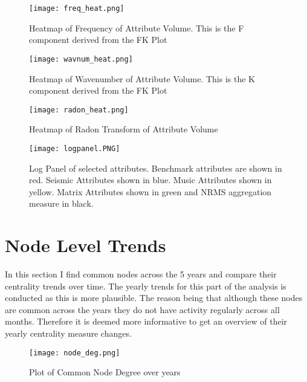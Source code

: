 \begin{figure}[!htp]
    \centering
    \texttt{[image: freq\_heat.png]}
    \caption{Heatmap of Frequency of Attribute Volume. This is the F component derived from the FK Plot}
    \label{fig:Frequency Heatmap}
\end{figure}

\begin{figure}[!htp]
    \centering
    \texttt{[image: wavnum\_heat.png]}
    \caption{Heatmap of Wavenumber of Attribute Volume. This is the K component derived from the FK Plot}
    \label{fig:Wavenumber Heatmap}
\end{figure}

\begin{figure}[!htp]
    \centering
    \texttt{[image: radon\_heat.png]}
    \caption{Heatmap of Radon Transform of Attribute Volume}
    \label{fig: Radon Heatmap}
\end{figure}

\begin{sidewaysfigure}
    \texttt{[image: logpanel.PNG]}
    \caption{Log Panel of selected attributes. Benchmark attributes are shown in red. Seismic Attributes shown in blue. Music Attributes shown in yellow. Matrix Attributes shown in green and NRMS aggregation measure in black.}
    \label{fig: logpanel}
\end{sidewaysfigure}

\clearpage{}
\section{Node Level Trends}\label{nodeplots}

In this section I find common nodes across the 5 years and compare their centrality trends over time. The yearly trends for this part of the analysis is conducted as this is more plausible. The reason being that although these nodes are common across the years they do not have activity regularly across all months. Therefore it is deemed more informative to get an overview of their yearly centrality measure changes.\\

\begin{figure}[!htp]
    \centering
    \texttt{[image: node\_deg.png]}
    \caption{Plot of Common Node Degree over years}
    \label{fig: Plot of Common Node Degree Centrality over years}
\end{figure}

